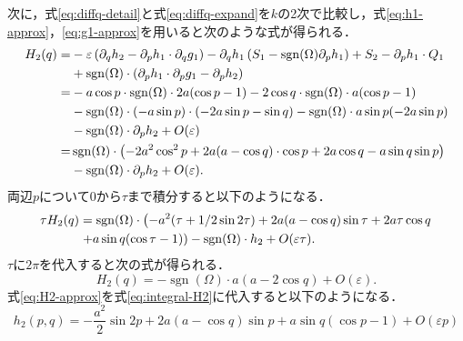 \documentclass[../main]{subfiles}
\begin{document}
    次に，式\eqref{eq:diffq-detail}と式\eqref{eq:diffq-expand}を$k$の2次で比較し，式\eqref{eq:h1-approx}，\eqref{eq:g1-approx}を用いると次のような式が得られる．
    \begin{align}
        \begin{split}
            H_2(q)=&-\varepsilon \left(\partial_q h_2-\partial_p h_1\cdot \partial_q g_1\right)-\partial_q h_1\left(S_1-\operatorname{sgn}(\Omega)\partial_p h_1\right)+S_2-\partial_p h_1\cdot Q_1\\
            &+\operatorname{sgn}(\Omega)\cdot(\partial_p h_1\cdot \partial_p g_1-\partial_p h_2)\\
            =&-a\cos p\cdot \operatorname{sgn}(\Omega)\cdot 2a(\cos p-1)-2\cos q\cdot \operatorname{sgn}(\Omega)\cdot a(\cos p-1)\\
            &-\operatorname{sgn}(\Omega)\cdot(-a\sin p)\cdot (-2a\sin p-\sin q)-\operatorname{sgn}(\Omega)\cdot a\sin p(-2a\sin p)\notag\\
            &-\operatorname{sgn}(\Omega)\cdot\partial_p h_2+O(\varepsilon)\\
            =&\operatorname{sgn}(\Omega)\cdot \left(-2a^2\cos^2 p+2a(a-\cos q)\cdot \cos p+2a\cos q-a\sin q\sin p\right)\notag\\
            &-\operatorname{sgn}(\Omega)\cdot\partial_p h_2+O(\varepsilon).
        \end{split}
    \end{align}
    両辺$p$について$0$から$\tau$まで積分すると以下のようになる．
    \begin{align}
        \label{eq:integral-H2}
        \tau H_2(q)&=\operatorname{sgn}(\Omega)\cdot \left(-a^2(\tau+1/2\sin 2\tau)+2a(a-\cos q)\sin \tau+2a\tau\cos q\right.\notag\\
        &\left.+a\sin q(\cos\tau-1)\right)-\operatorname{sgn}(\Omega)\cdot h_2+O(\varepsilon\tau).
    \end{align}
    $\tau$に$2\pi$を代入すると次の式が得られる． 
    \begin{equation}
        \label{eq:H2-approx}
        H_2(q)=-\operatorname{sgn}(\Omega)\cdot a(a-2\cos q)+O(\varepsilon).
    \end{equation}
    式\eqref{eq:H2-approx}を式\eqref{eq:integral-H2}に代入すると以下のようになる．
    \begin{equation}
        \label{eq:h2-approx}
        h_2(p,q)=-\frac{a^2}{2}\sin 2p +2a(a-\cos q)\sin p+a\sin q(\cos p-1)+O(\varepsilon p)
    \end{equation}
\end{document}
